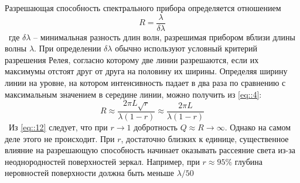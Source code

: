 Разрешающая способность спектрального прибора определяется отношением
\
\begin{equation}
  R = \frac{\lambda}{\delta \lambda}
\end{equation}
\
где $\delta \lambda$ -- минимальная разность длин волн, разрешимая 
прибором вблизи длины волны $\lambda$. При определении $\delta \lambda$
обычно используют условный критерий разрешения Релея, согласно 
которому две линии разрешаются, если их максимумы отстоят друг от 
друга на половину их ширины. Определяя ширину линии на уровне, на 
котором интенсивность падает в два раза по сравнению с максимальным 
значением в середине линии, можно получить из \eqref{eq::4}:
\
\begin{equation}\label{eq::12}
  R \approx \frac{2 \pi L \sqrt{r}}{\lambda (1 - r)} \approx \frac{2 \pi L}{\lambda (1 - r)}
\end{equation}
\
Из \eqref{eq::12} следует, что при $r \rightarrow 1$ добротность
$Q \approx R \rightarrow \infty$. Однако на самом деле этого не происходит.
При $r$, достаточно близких к единице, существенное влияние на
разрешающую способность начинает оказывать рассеяние света из-за
неоднородностей поверхностей зеркал. Например, при
$r \approx 95\%$ глубина неровностей поверхности должна быть
меньше $\lambda / 50$
